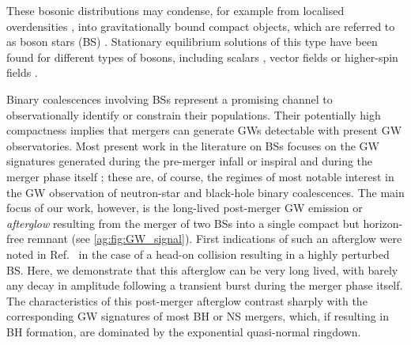 These bosonic distributions may condense, for example from localised overdensities \cite{Widdicombe:2018oeo}, into gravitationally bound compact objects, which are referred to as boson stars (BS) \cite{Amin:2018xfe,PhysRev.172.1331,PhysRev.187.1767,PhysRev.97.511,Visinelli:2021uve,Liebling:2012fv,Schunck:2003kk,Guerra:2019srj,Vaglio:2022flq,Cardoso:2022vpj,Amin:2021tnq,Zhang:2020bec}. Stationary equilibrium solutions of this type have been
found for different types of bosons, including scalars \cite{Sanchis-Gual:2020mzb,Alcubierre:2021psa,Boskovic:2021nfs,Astefanesei:2003qy,Kaup:1968zz,Ruffini:1969qy,Colpi:1986ye,Lee:1986ts,Friedberg:1986tq,Schunck:1999zu,Jetzer:1989av,Pugliese:2013gsa,Hawley:2002zn,Urena-Lopez:2012udq,Muia:2019coe,Helfer:2016ljl,Alcubierre:2018ahf,Coleman:1985ki,Guerra:2019srj,Kleihaus:2005me,Kleihaus:2011sx,Cardoso:2014sna,Amin:2014fua,Amin:2011hj,Amin:2010dc}, vector fields \cite{Brito:2015pxa,Minamitsuji:2018kof,Brito:2015yga,Zhang:2021xxa,CalderonBustillo:2022cja,March-Russell:2022zll,Gorghetto:2022sue,Herdeiro:2021lwl,Bustillo:2020syj,Minamitsuji:2017pdr,Sanchis-Gual:2017bhw,Duarte:2016lig,SalazarLandea:2016bys,Zilhao:2015tya} or higher-spin fields \cite{Jain:2021pnk}.

Binary coalescences involving BSs
represent a promising channel to observationally
identify or constrain their populations. Their potentially high compactness implies that mergers can generate GWs detectable with present GW observatories. Most present work in the literature on BSs focuses on the GW signatures generated during the pre-merger infall or inspiral
\cite{Herdeiro:2020kba,Cardoso:2017cfl,Sennett:2017etc,Diamond:2021dth,Pacilio:2020jza} and during the
merger phase itself \cite{Amin:2020vja,Sanchis-Gual:2018oui,Sanchis-Gual:2020mzb,Sanchis_Gual_2019,Widdicombe:2019woy,
Helfer:2018vtq,Palenzuela:2017kcg,Bezares:2018qwa,Liebling:2012fv,Choptuik:2009ww,Palenzuela:2007dm,Bezares:2017mzk,
Palenzuela:2006wp,Dietrich:2018jov,Dietrich:2018bvi,Jaramillo:2022zwg,Bezares:2022obu,Macedo:2013jja}; these are, of course, the regimes of most notable
interest in the GW observation of neutron-star and black-hole
binary coalescences. The main focus of our work, however, is
the long-lived post-merger GW emission or {\it afterglow} resulting
from the merger of two BSs into a single compact but horizon-free
remnant (see \ref{ag:fig:GW_signal}).
First indications of such an afterglow were noted in Ref.~\cite{Helfer:2018vtq} in the case of a head-on collision resulting in a highly perturbed BS. Here, we demonstrate that this afterglow can be very long lived, with barely any decay in amplitude following a transient burst during the merger phase itself. The characteristics of this post-merger afterglow contrast sharply with the corresponding GW signatures of most BH or NS mergers, which, if
resulting in BH formation, are dominated by the exponential quasi-normal ringdown.



